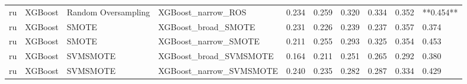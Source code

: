 \begin{tabular}{llllllllll}
      ru &                      XGBoost & Random Oversampling &                           XGBoost\_narrow\_ROS & 0.234 &                     0.259 &                 0.320 &                  0.334 &                                   0.352 & **0.454** \\
      ru &                      XGBoost &               SMOTE &                          XGBoost\_broad\_SMOTE & 0.231 &                     0.226 &                 0.239 &                  0.237 &                                   0.357 &     0.374 \\
      ru &                      XGBoost &               SMOTE &                         XGBoost\_narrow\_SMOTE & 0.211 &                     0.255 &                 0.293 &                  0.325 &                                   0.354 &     0.453 \\
      ru &                      XGBoost &            SVMSMOTE &                       XGBoost\_broad\_SVMSMOTE & 0.164 &                     0.211 &                 0.251 &                  0.265 &                                   0.292 &     0.380 \\
      ru &                      XGBoost &            SVMSMOTE &                      XGBoost\_narrow\_SVMSMOTE & 0.240 &                     0.235 &                 0.282 &                  0.287 &                                   0.334 &     0.429 \\
\bottomrule
\end{tabular}
